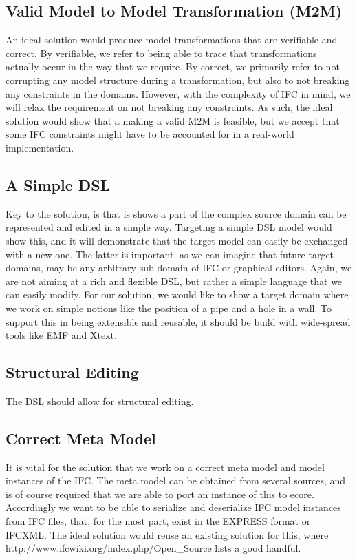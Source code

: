 \subsection{Valid Model to Model Transformation (M2M)}
An ideal solution would produce model transformations that are verifiable and correct. By verifiable, we refer to being able to trace that transformations actually occur in the way that we require. By correct, we primarily refer to not corrupting any model structure during a transformation, but also to not breaking any constraints in the domains. However, with the complexity of IFC in mind, we will relax the requirement on not breaking any constraints. As such, the ideal solution would show that a making a valid M2M is feasible, but we accept that some IFC constraints might have to be accounted for in a real-world implementation.

\subsection{A Simple DSL}
Key to the solution, is that is shows a part of the complex source domain can be represented and edited in a simple way. Targeting a simple DSL model would show this, and it will demonstrate that the target model can easily be exchanged with a new one. The latter is important, as we can imagine that future target domains, may be any arbitrary sub-domain of IFC or graphical editors. Again, we are not aiming at a rich and flexible DSL, but rather a simple language that we can easily modify. For our solution, we would like to show a target domain where we work on simple notions like the position of a pipe and a hole in a wall. To support this in being extensible and reusable, it should be build with wide-spread tools like EMF and Xtext.

\subsection{Structural Editing}
The DSL should allow for structural editing.

\subsection{Correct Meta Model}
It is vital for the solution that we work on a correct meta model and model instances of the IFC. The meta model can be obtained from several sources,
and is of course required that we are able to port an instance of this to ecore. Accordingly we want to be able to serialize and deserialize IFC model instances from IFC files, that, for the most part, exist in the EXPRESS format or IFCXML. The ideal solution would reuse an existing solution for this, where http://www.ifcwiki.org/index.php/Open_Source lists a good handful.


